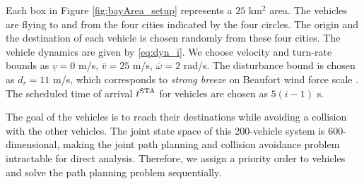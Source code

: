Each box in Figure \ref{fig:bayArea_setup} represents a $25$ km$^2$ area. The vehicles are flying to and from the four cities indicated by the four circles. The origin and the destination of each vehicle is chosen randomly from these four cities. The vehicle dynamics are given by \eqref{eq:dyn_i}. We choose velocity and turn-rate bounds as $\underline{v} = 0$ m/s, $\bar{v} = 25$ m/s, $\bar\omega = 2$ rad/s. The disturbance bound is chosen as $d_{r} = 11$ m/s, which corresponds to \textit{strong breeze} on Beaufort wind force scale \cite{Windscale}. The scheduled time of arrival $t^\text{STA}$ for vehicles are chosen as $5(i-1)$ s.

The goal of the vehicles is to reach their destinations while avoiding a collision with the other vehicles. The joint state space of this 200-vehicle system is 600-dimensional, making the joint path planning and collision avoidance problem intractable for direct analysis. Therefore, we assign a priority order to vehicles and solve the path planning problem sequentially.
